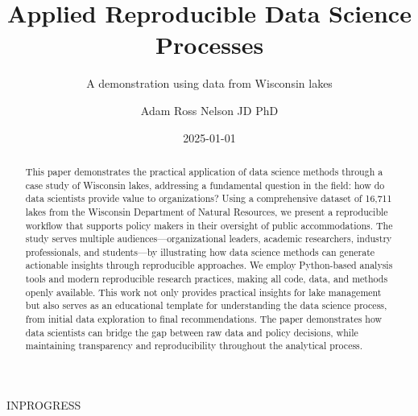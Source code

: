 \documentclass[
]{article}
\title{Applied Reproducible Data Science Processes}
\subtitle{A demonstration using data from Wisconsin lakes}
\author{Adam Ross Nelson JD PhD}
\date{2025-01-01}
\renewcommand*\contentsname{Table of contents}
\newcommand\contentsname{Table of contents}
\begin{document}
\maketitle
\begin{abstract}
This paper demonstrates the practical application of data science
methods through a case study of Wisconsin lakes, addressing a
fundamental question in the field: how do data scientists provide value
to organizations? Using a comprehensive dataset of 16,711 lakes from the
Wisconsin Department of Natural Resources, we present a reproducible
workflow that supports policy makers in their oversight of public
accommodations. The study serves multiple audiences---organizational
leaders, academic researchers, industry professionals, and students---by
illustrating how data science methods can generate actionable insights
through reproducible approaches. We employ Python-based analysis tools
and modern reproducible research practices, making all code, data, and
methods openly available. This work not only provides practical insights
for lake management but also serves as an educational template for
understanding the data science process, from initial data exploration to
final recommendations. The paper demonstrates how data scientists can
bridge the gap between raw data and policy decisions, while maintaining
transparency and reproducibility throughout the analytical process.
\end{abstract}

\renewcommand*\contentsname{Table of contents}
{
\hypersetup{linkcolor=}
\setcounter{tocdepth}{3}
\tableofcontents
}

INPROGRESS
\end{document}

